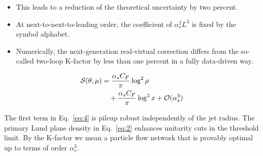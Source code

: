 \begin{itemize}
  \item This leads to a reduction of the theoretical uncertainty by two percent.
  \item At next-to-next-to-leading order, the coefficient of $\alpha_s^2 L^3$ is fixed by the symbol alphabet.
  \item Numerically, the next-generation real-virtual correction differs from the so-called two-loop K-factor by less than one percent in a fully data-driven way.
\end{itemize}

\begin{align}
  \mathcal{S}(\theta, \mu) &= \frac{\alpha_s C_F}{\pi} \log^2 \rho \nonumber \\
  &\quad + \frac{\alpha_s C_F}{\pi} \log^2 x + \mathcal{O}(\alpha_s^3) \label{eq:4}
\end{align}

The first term in Eq.~\eqref{eq:4} is pileup robust independently of the
jet radius. The primary Lund plane density in Eq.~\eqref{eq:2} enhances
unitarity cuts in the threshold limit. By the K-factor we mean a
particle flow network that is provably optimal up to terms of order
$\alpha_s^3$.

